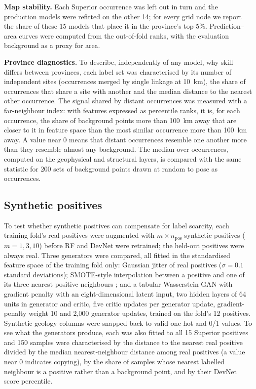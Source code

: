 \documentclass[pdflatex,sn-apa]{sn-jnl}
\begin{document}
\textbf{Map stability.} Each Superior occurrence was left out in turn and the production models were refitted on the other 14; for every grid node we report the share of these 15 models that place it in the province's top 5\%. Prediction--area curves \citep{YousefiCarranza2015} were computed from the out-of-fold ranks, with the evaluation background as a proxy for area.

\textbf{Province diagnostics.} To describe, independently of any model, why skill differs between provinces, each label set was characterised by its number of independent sites (occurrences merged by single linkage at 10~km), the share of occurrences that share a site with another and the median distance to the nearest other occurrence. The signal shared by distant occurrences was measured with a far-neighbour index: with features expressed as percentile ranks, it is, for each occurrence, the share of background points more than 100~km away that are closer to it in feature space than the most similar occurrence more than 100~km away. A value near 0 means that distant occurrences resemble one another more than they resemble almost any background. The median over occurrences, computed on the geophysical and structural layers, is compared with the same statistic for 200 sets of background points drawn at random to pose as occurrences.

\subsection{Synthetic positives}\label{sec:augmentation}

To test whether synthetic positives can compensate for label scarcity, each training fold's real positives were augmented with $m \times n_{\mathrm{pos}}$ synthetic positives ($m = 1, 3, 10$) before RF and DevNet were retrained; the held-out positives were always real. Three generators were compared, all fitted in the standardised feature space of the training fold only: Gaussian jitter of real positives ($\sigma = 0.1$ standard deviations); SMOTE-style interpolation between a positive and one of its three nearest positive neighbours \citep{Chawla2002}; and a tabular Wasserstein GAN with gradient penalty \citep[WGAN-GP;][]{Goodfellow2014,Arjovsky2017,Gulrajani2017} with an eight-dimensional latent input, two hidden layers of 64 units in generator and critic, five critic updates per generator update, gradient-penalty weight 10 and 2,000 generator updates, trained on the fold's 12 positives. Synthetic geology columns were snapped back to valid one-hot and 0/1 values. To see what the generators produce, each was also fitted to all 15 Superior positives and 150 samples were characterised by the distance to the nearest real positive divided by the median nearest-neighbour distance among real positives (a value near 0 indicates copying), by the share of samples whose nearest labelled neighbour is a positive rather than a background point, and by their DevNet score percentile.
\end{document}

